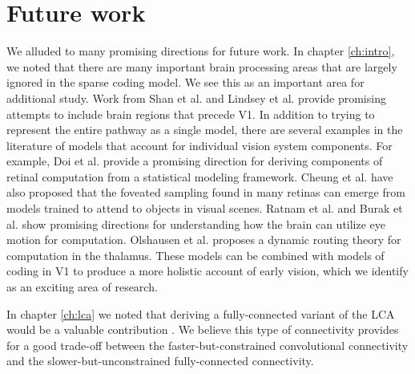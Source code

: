 \section{Future work}\label{sec:ch5_future_work}
We alluded to many promising directions for future work. In chapter \ref{ch:intro}, we noted that there are many important brain processing areas that are largely ignored in the sparse coding model. We see this as an important area for additional study. Work from Shan et al. \citeyearpar{shan2013efficient} and Lindsey et al. \citeyearpar{lindsey2019unified} provide promising attempts to include brain regions that precede V1. In addition to trying to represent the entire pathway as a single model, there are several examples in the literature of models that account for individual vision system components. For example, Doi et al. \citeyearpar{doi2007theory} provide a promising direction for deriving components of retinal computation from a statistical modeling framework. Cheung et al. \citeyearpar{cheung2016emergence} have also proposed that the foveated sampling found in many retinas can emerge from models trained to attend to objects in visual scenes. Ratnam et al. \citeyearpar{ratnam2017benefits} and Burak et al. \citeyearpar{burak2010bayesian} show promising directions for understanding how the brain can utilize eye motion for computation. Olshausen et al. \citeyearpar{olshausen1993neurobiological} proposes a dynamic routing theory for computation in the thalamus. These models can be combined with models of coding in V1 to produce a more holistic account of early vision, which we identify as an exciting area of research.

In chapter \ref{ch:lca} we noted that deriving a fully-connected variant of the LCA would be a valuable contribution \parencite{le2011building, ngiam2010tiled}. We believe this type of connectivity provides for a good trade-off between the faster-but-constrained convolutional connectivity and the slower-but-unconstrained fully-connected connectivity.

